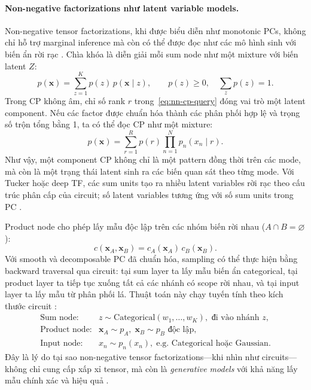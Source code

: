 \paragraph{Non-negative factorizations như latent variable models.}
Non-negative tensor factorizations, khi được biểu diễn như monotonic PCs, không chỉ
hỗ trợ marginal inference mà còn có thể được đọc như các mô hình sinh với biến ẩn
rời rạc \cite{loconte2025relationship}.
Chìa khóa là diễn giải mỗi sum node như một mixture với biến latent $Z$:
\begin{equation}
    p(\mathbf{x}) = \sum_{z=1}^{K} p(z)\, p(\mathbf{x} \mid z),
    \qquad p(z) \geq 0,\quad \sum_z p(z) = 1.
    \label{eq:sum-mixture}
\end{equation}
Trong CP không âm, chỉ số rank $r$ trong~\eqref{eq:nn-cp-query} đóng vai trò một
latent component.  Nếu các factor được chuẩn hóa thành các phân phối hợp lệ và trọng
số trộn tổng bằng 1, ta có thể đọc CP như một mixture:
\begin{equation}
    p(\mathbf{x})
    =
    \sum_{r=1}^{R}p(r)\prod_{n=1}^{N}p_n(x_n\mid r).
    \label{eq:cp-latent-mixture}
\end{equation}
Như vậy, một component CP không chỉ là một pattern đồng thời trên các mode, mà còn là
một trạng thái latent sinh ra các biến quan sát theo từng mode.  Với Tucker hoặc deep
TF, các sum units tạo ra nhiều latent variables rời rạc theo cấu trúc phân cấp của
circuit; số latent variables tương ứng với số sum units trong PC
\cite{loconte2025relationship}.

Product node cho phép lấy mẫu độc lập trên các nhóm biến rời nhau
($A \cap B = \varnothing$):
\begin{equation}
    c(\mathbf{x}_A, \mathbf{x}_B) = c_A(\mathbf{x}_A)\, c_B(\mathbf{x}_B).
\end{equation}
Với smooth và decomposable PC đã chuẩn hóa, sampling có thể thực hiện bằng backward
traversal qua circuit: tại sum layer ta lấy mẫu biến ẩn categorical, tại product layer
ta tiếp tục xuống tất cả các nhánh có scope rời nhau, và tại input layer ta lấy mẫu
từ phân phối lá. Thuật toán này chạy tuyến tính theo kích thước circuit
\cite{loconte2025relationship, choi2021probabilistic}:
\begin{equation}
    \begin{array}{ll}
        \text{Sum node:}     & z \sim \mathrm{Categorical}(w_1,\ldots,w_K),
                               \text{ đi vào nhánh } z, \\[1mm]
        \text{Product node:} & \mathbf{x}_A \sim p_A,\;
                               \mathbf{x}_B \sim p_B \text{ độc lập}, \\[1mm]
        \text{Input node:}   & x_n \sim p_n(x_n),\;
                               \text{e.g. Categorical hoặc Gaussian.}
    \end{array}
    \label{eq:sampling}
\end{equation}
Đây là lý do tại sao non-negative tensor factorizations---khi nhìn như circuits---
không chỉ cung cấp xấp xỉ tensor, mà còn là \emph{generative models} với khả năng
lấy mẫu chính xác và hiệu quả \cite{loconte2025relationship}.

